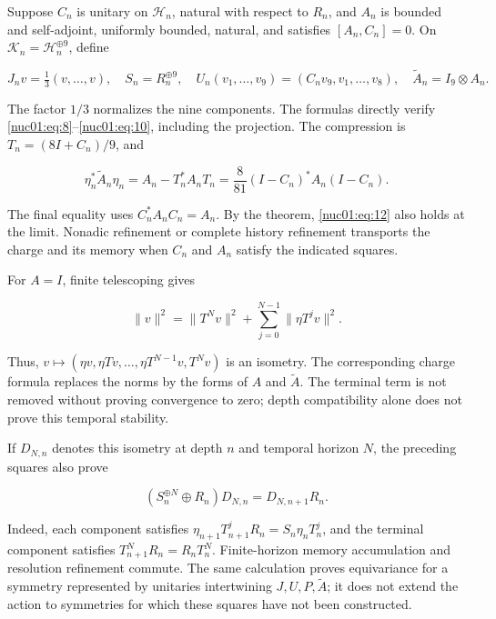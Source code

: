 Suppose \(C_n\) is unitary on \(\mathscr H_n\), natural with respect to \(R_n\), and \(A_n\) is bounded and self-adjoint, uniformly bounded, natural, and satisfies \([A_n,C_n]=0\). On \(\mathscr K_n=\mathscr H_n^{\oplus9}\), define

\[
J_nv=\tfrac13(v,\ldots,v),\quad
S_n=R_n^{\oplus9},\quad
U_n(v_1,\ldots,v_9)=(C_nv_9,v_1,\ldots,v_8),
\quad \widetilde A_n=I_9\otimes A_n.
\]

The factor \(1/3\) normalizes the nine components. The formulas directly verify \eqref{nuc01:eq:8}–\eqref{nuc01:eq:10}, including the projection. The compression is \(T_n=(8I+C_n)/9\), and

\begin{equation}
\eta_n^*\widetilde A_n\eta_n
=A_n-T_n^*A_nT_n
=\frac8{81}(I-C_n)^*A_n(I-C_n).
\label{nuc01:eq:12}
\end{equation}

The final equality uses \(C_n^*A_nC_n=A_n\). By the theorem, \eqref{nuc01:eq:12} also holds at the limit. Nonadic refinement or complete history refinement transports the charge and its memory when \(C_n\) and \(A_n\) satisfy the indicated squares.

For \(A=I\), finite telescoping gives

\[
\|v\|^2=\|T^Nv\|^2+\sum_{j=0}^{N-1}\|\eta T^jv\|^2.
\]

Thus, \(v\mapsto(\eta v,\eta Tv,\ldots,\eta T^{N-1}v,T^Nv)\) is an isometry. The corresponding charge formula replaces the norms by the forms of \(A\) and \(\widetilde A\). The terminal term is not removed without proving convergence to zero; depth compatibility alone does not prove this temporal stability.

If \(D_{N,n}\) denotes this isometry at depth \(n\) and temporal horizon \(N\), the preceding squares also prove

\[
(S_n^{\oplus N}\oplus R_n)D_{N,n}
=D_{N,n+1}R_n.
\]

Indeed, each component satisfies \(\eta_{n+1}T_{n+1}^jR_n=S_n\eta_nT_n^j\), and the terminal component satisfies \(T_{n+1}^NR_n=R_nT_n^N\). Finite-horizon memory accumulation and resolution refinement commute. The same calculation proves equivariance for a symmetry represented by unitaries intertwining \(J,U,P,\widetilde A\); it does not extend the action to symmetries for which these squares have not been constructed.
